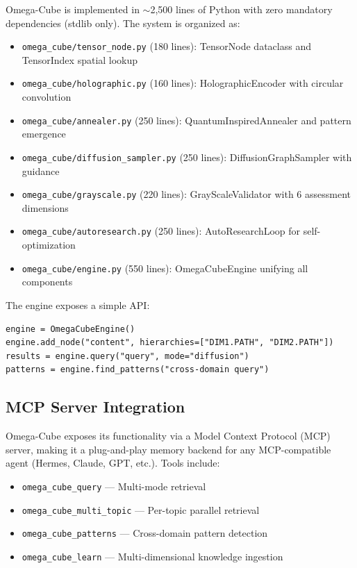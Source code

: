 \documentclass[11pt,a4paper]{article}
\begin{document}
Omega-Cube is implemented in $\sim$2,500 lines of Python with zero mandatory dependencies (stdlib only). The system is organized as:

\begin{itemize}[leftmargin=*,itemsep=0pt]
    \item \texttt{omega\_cube/tensor\_node.py} (180 lines): TensorNode dataclass and TensorIndex spatial lookup
    \item \texttt{omega\_cube/holographic.py} (160 lines): HolographicEncoder with circular convolution
    \item \texttt{omega\_cube/annealer.py} (250 lines): QuantumInspiredAnnealer and pattern emergence
    \item \texttt{omega\_cube/diffusion\_sampler.py} (250 lines): DiffusionGraphSampler with guidance
    \item \texttt{omega\_cube/grayscale.py} (220 lines): GrayScaleValidator with 6 assessment dimensions
    \item \texttt{omega\_cube/autoresearch.py} (250 lines): AutoResearchLoop for self-optimization
    \item \texttt{omega\_cube/engine.py} (550 lines): OmegaCubeEngine unifying all components
\end{itemize}

The engine exposes a simple API:
\begin{verbatim}
engine = OmegaCubeEngine()
engine.add_node("content", hierarchies=["DIM1.PATH", "DIM2.PATH"])
results = engine.query("query", mode="diffusion")
patterns = engine.find_patterns("cross-domain query")
\end{verbatim}

\subsection{MCP Server Integration}

Omega-Cube exposes its functionality via a Model Context Protocol (MCP) server, making it a plug-and-play memory backend for any MCP-compatible agent (Hermes, Claude, GPT, etc.). Tools include:

\begin{itemize}[leftmargin=*,itemsep=0pt]
    \item \texttt{omega\_cube\_query} — Multi-mode retrieval
    \item \texttt{omega\_cube\_multi\_topic} — Per-topic parallel retrieval
    \item \texttt{omega\_cube\_patterns} — Cross-domain pattern detection
    \item \texttt{omega\_cube\_learn} — Multi-dimensional knowledge ingestion
\end{itemize}
\end{document}

